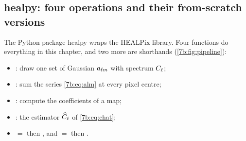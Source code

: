\subsection{healpy: four operations and their from-scratch versions}
\label{7b:sec:healpy}

The Python package healpy wraps the HEALPix library. Four functions do everything in this
chapter, and two more are shorthands (\cref{7b:fig:pipeline}):
\begin{itemize}[itemsep=1pt]
  \item {}: draw one set of Gaussian $a_{\ell m}$ with spectrum $C_\ell$;
  \item {}: sum the series \eqref{7b:eq:alm} at every pixel centre;
  \item {}: compute the coefficients of a map;
  \item {}: the estimator $\widehat{C}_\ell$ of \eqref{7b:eq:chat};
  \item {} $=$  then , and  $=$
         then .
\end{itemize}


